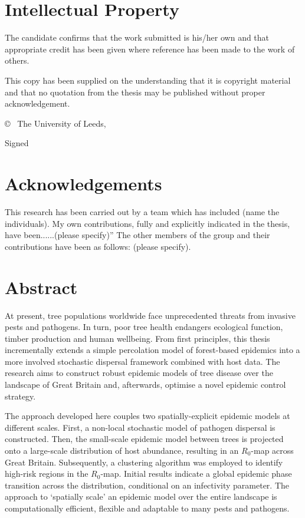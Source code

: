 \chapter*{Intellectual Property}
The candidate confirms that the work submitted is his/her own and that appropriate credit has been given where reference has been made to the work of others.

This copy has been supplied on the understanding that it is copyright material and that no quotation from the thesis may be published without proper acknowledgement.

© \submissionyear\ The University of Leeds, \name

\vspace{2cm}
Signed 

\chapter*{Acknowledgements}
This research has been carried out by a team which has included (name the individuals). My own contributions, fully and explicitly indicated in the thesis, have been......(please specify)” The other members of the group and their contributions have been as follows: (please specify).

\chapter*{Abstract}

At present, tree populations worldwide face unprecedented threats from invasive pests and pathogens. In turn, poor tree health endangers ecological function, timber production and human wellbeing. 
From first principles, this thesis incrementally extends a simple percolation model of forest-based epidemics into a more involved stochastic dispersal framework combined with host data. 
The research aims to construct robust epidemic models of tree disease over the landscape of Great Britain and, afterwards, optimise a novel epidemic control strategy.

The approach developed here couples two spatially-explicit epidemic models at different scales. 
First, a non-local stochastic model of pathogen dispersal is constructed. 
Then, the small-scale epidemic model between trees is projected onto a large-scale distribution of host abundance, resulting in an $R_0$-map across Great Britain. 
Subsequently, a clustering algorithm was employed to identify high-risk regions in the $R_0$-map. 
Initial results indicate a global epidemic phase transition across the distribution, conditional on an infectivity parameter.
The approach to `spatially scale' an epidemic model over the entire landscape is computationally efficient, flexible and adaptable to many pests and pathogens. 

